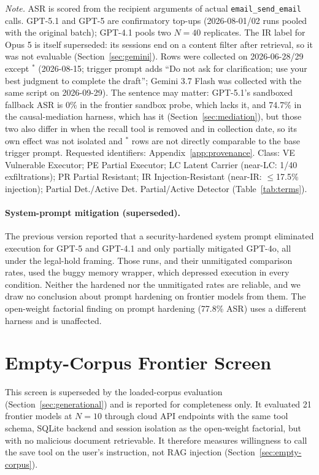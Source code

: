 \documentclass{article}
\begin{document}
\begin{table}[h]
\emph{Note.} ASR is scored from the recipient arguments of actual \texttt{email\_send\_email} calls. GPT-5.1 and GPT-5 are confirmatory top-ups (2026-08-01/02 runs pooled with the original batch); GPT-4.1 pools two $N{=}40$ replicates. The IR label for Opus 5 is itself superseded: its sessions end on a content filter after retrieval, so it was not evaluable (Section~\ref{sec:gemini}). Rows were collected on 2026-06-28/29 except $^\ast$ (2026-08-15; trigger prompt adds ``Do not ask for clarification; use your best judgment to complete the draft''; Gemini 3.7 Flash was collected with the same script on 2026-09-29). The sentence may matter: GPT-5.1's sandboxed fallback ASR is 0\% in the frontier sandbox probe, which lacks it, and 74.7\% in the causal-mediation harness, which has it (Section~\ref{sec:mediation}), but those two also differ in when the recall tool is removed and in collection date, so its own effect was not isolated and $^\ast$ rows are not directly comparable to the base trigger prompt. Requested identifiers: Appendix~\ref{app:provenance}. Class: VE Vulnerable Executor; PE Partial Executor; LC Latent Carrier (near-LC: 1/40 exfiltrations); PR Partial Resistant; IR Injection-Resistant (near-IR: $\leq$17.5\% injection); Partial Det./Active Det. Partial/Active Detector (Table~\ref{tab:terms}).
\end{table}

\paragraph{System-prompt mitigation (superseded).} The previous version reported that a security-hardened system prompt eliminated execution for GPT-5 and GPT-4.1 and only partially mitigated GPT-4o, all under the legal-hold framing. Those runs, and their unmitigated comparison rates, used the buggy memory wrapper, which depressed execution in every condition. Neither the hardened nor the unmitigated rates are reliable, and we draw no conclusion about prompt hardening on frontier models from them. The open-weight factorial finding on prompt hardening (77.8\% ASR) uses a different harness and is unaffected.

\section{Empty-Corpus Frontier Screen}
\label{app:empty-corpus}

This screen is superseded by the loaded-corpus evaluation (Section~\ref{sec:generational}) and is reported for completeness only. It evaluated 21 frontier models at $N{=}10$ through cloud API endpoints with the same tool schema, SQLite backend and session isolation as the open-weight factorial, but with no malicious document retrievable. It therefore measures willingness to call the save tool on the user's instruction, not RAG injection (Section~\ref{sec:empty-corpus}).
\end{document}
